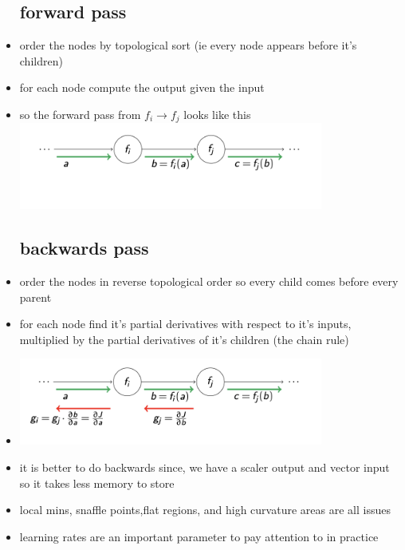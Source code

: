 \documentclass{article}
\begin{document}
\begin{itemize}
\subsection*{forward pass }
\item order the nodes by topological sort (ie every node appears before it's children)
\item for each node compute the output given the input
\item so the forward pass from $f_i\rightarrow f_j$ looks like this \includegraphics*[width=10cm]{images/Screenshot 2023-05-15 at 1.34.07 AM.png} 
\subsection*{backwards pass}
\item order the nodes in reverse topological order so every child comes before every parent 
\item for each node find it's partial derivatives with respect to it's inputs, multiplied by the partial derivatives of it's children (the chain rule)
\item \includegraphics*[width=10cm]{images/Screenshot 2023-05-15 at 1.38.11 AM.png}
\item it is better to do backwards since, we have a scaler output and vector input so it takes less memory to store
\item local mins, snaffle points,flat regions, and high curvature areas are all issues
\item learning rates are an important parameter to pay attention to in practice
\end{itemize}
\end{document}
